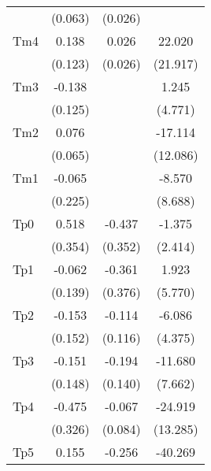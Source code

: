 {\begin{tabular}{l*{3}{c}}
                    &     (0.063)         &     (0.026)         &                     \\
[1em]
Tm4                 &       0.138         &       0.026         &      22.020         \\
                    &     (0.123)         &     (0.026)         &    (21.917)         \\
[1em]
Tm3                 &      -0.138         &                     &       1.245         \\
                    &     (0.125)         &                     &     (4.771)         \\
[1em]
Tm2                 &       0.076         &                     &     -17.114         \\
                    &     (0.065)         &                     &    (12.086)         \\
[1em]
Tm1                 &      -0.065         &                     &      -8.570         \\
                    &     (0.225)         &                     &     (8.688)         \\
[1em]
Tp0                 &       0.518         &      -0.437         &      -1.375         \\
                    &     (0.354)         &     (0.352)         &     (2.414)         \\
[1em]
Tp1                 &      -0.062         &      -0.361         &       1.923         \\
                    &     (0.139)         &     (0.376)         &     (5.770)         \\
[1em]
Tp2                 &      -0.153         &      -0.114         &      -6.086         \\
                    &     (0.152)         &     (0.116)         &     (4.375)         \\
[1em]
Tp3                 &      -0.151         &      -0.194         &     -11.680         \\
                    &     (0.148)         &     (0.140)         &     (7.662)         \\
[1em]
Tp4                 &      -0.475         &      -0.067         &     -24.919\sym{*}  \\
                    &     (0.326)         &     (0.084)         &    (13.285)         \\
[1em]
Tp5                 &       0.155         &      -0.256\sym{**} &     -40.269\sym{*}  \\

\end{tabular}}
